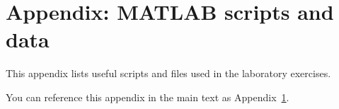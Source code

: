 \appendix
\section{Appendix: MATLAB scripts and data}
\label{app:matlab}

This appendix lists useful scripts and files used in the laboratory exercises.



You can reference this appendix in the main text as Appendix~\ref{app:matlab}.